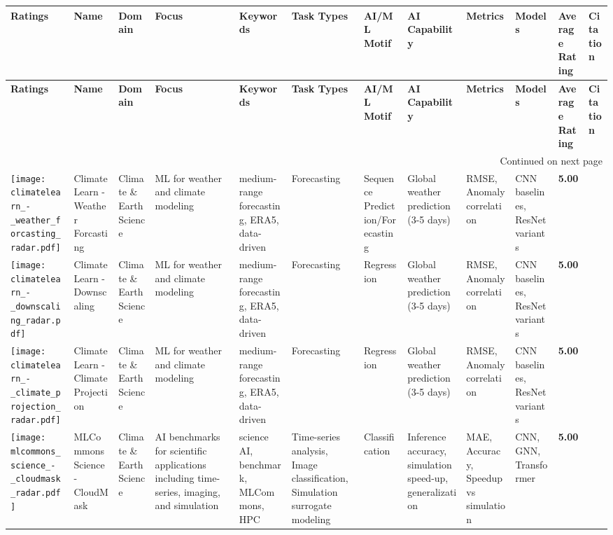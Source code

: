 
\begin{landscape}
{\footnotesize
\begin{longtable}{|p{}|p{}|p{}|p{}|p{}|p{}|p{}|p{}|p{}|p{}|p{}|p{}|}
\hline
\textbf{Ratings} & \textbf{Name} & \textbf{Domain} & \textbf{Focus} & \textbf{Keywords} & \textbf{Task Types} & \textbf{AI/ML Motif} & \textbf{AI Capability} & \textbf{Metrics} & \textbf{Models} & \textbf{Average Rating} & \textbf{Citation}  \\ \hline
\endfirsthead
\hline
\textbf{Ratings} & \textbf{Name} & \textbf{Domain} & \textbf{Focus} & \textbf{Keywords} & \textbf{Task Types} & \textbf{AI/ML Motif} & \textbf{AI Capability} & \textbf{Metrics} & \textbf{Models} & \textbf{Average Rating} & \textbf{Citation}  \\ \hline
\endhead
\hline
\multicolumn{12}{r}{Continued on next page} \\
\endfoot
\hline
\endlastfoot
\texttt{[image: climatelearn\_-\_weather\_forcasting\_radar.pdf]} & ClimateLearn - Weather Forcasting & Climate \& Earth Science & ML for weather and climate modeling & medium-range forecasting, ERA5, data-driven & Forecasting & Sequence Prediction/Forecasting & Global weather prediction (3-5 days) & RMSE, Anomaly correlation & CNN baselines, ResNet variants & \textbf{5.00} & \cite{nguyen2023climatelearnbenchmarkingmachinelearning} \\ \hline
\texttt{[image: climatelearn\_-\_downscaling\_radar.pdf]} & ClimateLearn - Downscaling & Climate \& Earth Science & ML for weather and climate modeling & medium-range forecasting, ERA5, data-driven & Forecasting & Regression & Global weather prediction (3-5 days) & RMSE, Anomaly correlation & CNN baselines, ResNet variants & \textbf{5.00} & \cite{nguyen2023climatelearnbenchmarkingmachinelearning} \\ \hline
\texttt{[image: climatelearn\_-\_climate\_projection\_radar.pdf]} & ClimateLearn - Climate Projection & Climate \& Earth Science & ML for weather and climate modeling & medium-range forecasting, ERA5, data-driven & Forecasting & Regression & Global weather prediction (3-5 days) & RMSE, Anomaly correlation & CNN baselines, ResNet variants & \textbf{5.00} & \cite{nguyen2023climatelearnbenchmarkingmachinelearning} \\ \hline
\texttt{[image: mlcommons\_science\_-\_cloudmask\_radar.pdf]} & MLCommons Science - CloudMask & Climate \& Earth Science & AI benchmarks for scientific applications including time-series, imaging, and simulation & science AI, benchmark, MLCommons, HPC & Time-series analysis, Image classification, Simulation surrogate modeling & Classification & Inference accuracy, simulation speed-up, generalization & MAE, Accuracy, Speedup vs simulation & CNN, GNN, Transformer & \textbf{5.00} & \cite{10.1007/978-3-031-23220-6_4} \\ \hline

\end{longtable}}
\end{landscape}
